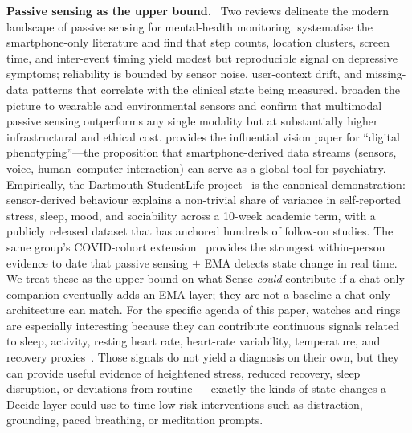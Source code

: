 \documentclass[10pt,conference]{article}
\renewcommand{\paragraph}[1]{\smallskip\par\noindent\textbf{#1}~\ignorespaces}
\begin{document}
\paragraph{Passive sensing as the upper bound.}
Two reviews delineate the modern landscape of passive sensing for
mental-health monitoring. \cite{Cornet2018PassiveSensing} systematise
the smartphone-only literature and find that step counts, location
clusters, screen time, and inter-event timing yield modest but
reproducible signal on depressive symptoms; reliability is bounded by
sensor noise, user-context drift, and missing-data patterns that
correlate with the clinical state being measured.
\cite{Sequeira2021PassiveSensing} broaden the picture to wearable and
environmental sensors and confirm that multimodal passive sensing
outperforms any single modality but at substantially higher
infrastructural and ethical cost. \cite{Insel2018DigitalPhenotyping}
provides the influential vision paper for ``digital phenotyping''---the
proposition that smartphone-derived data streams (sensors, voice,
human--computer interaction) can serve as a global tool for
psychiatry. Empirically, the Dartmouth StudentLife
project~\cite{Wang2014StudentLife} is the canonical demonstration:
sensor-derived behaviour explains a non-trivial share of variance in
self-reported stress, sleep, mood, and sociability across a 10-week
academic term, with a publicly released dataset that has anchored
hundreds of follow-on studies. The same group's
COVID-cohort extension~\cite{Wang2020COVIDStudentLife} provides the
strongest within-person evidence to date that passive sensing $+$ EMA
detects state change in real time. We treat these as the upper bound on
what Sense \emph{could} contribute if a chat-only companion eventually
adds an EMA layer; they are not a baseline a chat-only architecture
can match. For the specific agenda of this paper, watches and rings are
especially interesting because they can contribute continuous signals
related to sleep, activity, resting heart rate, heart-rate variability,
temperature, and recovery proxies~\cite{Sequeira2021PassiveSensing,Laborde2017HRV}.
Those signals do not yield a diagnosis on their own, but they can
provide useful evidence of heightened stress, reduced recovery, sleep
disruption, or deviations from routine --- exactly the kinds of state
changes a Decide layer could use to time low-risk interventions such as
distraction, grounding, paced breathing, or meditation prompts.
\end{document}
